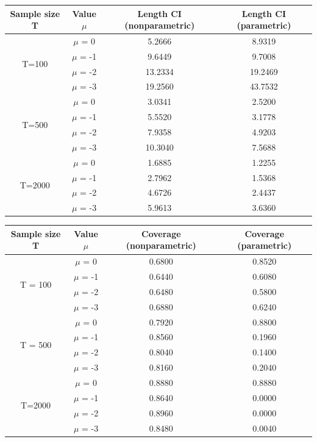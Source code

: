 \documentclass[12pt]{article}
\begin{document}
\begin{center}
\begin{tabular}{||c | c | c c||} 
 \hline
 Sample size T & Value $\mu$ & Length CI (nonparametric) & Length CI (parametric) \\ [0.5ex] 
 \hline\hline
 \multirow{4}{4em}{T=100} & $\mu$ = 0 & 5.2666 & 8.9319\\ 
& $\mu$ = -1 & 9.6449 & 9.7008 \\ 
& $\mu$ = -2 & 13.2334 & 19.2469 \\ 
& $\mu$ = -3 & 19.2560 & 43.7532 \\ 
 \hline
 \multirow{4}{4em}{T=500} & $\mu$ = 0 & 3.0341 & 2.5200\\ 
& $\mu$ = -1 & 5.5520 & 3.1778 \\ 
& $\mu$ = -2 & 7.9358 & 4.9203 \\ 
& $\mu$ = -3 & 10.3040 & 7.5688 \\ 
 \hline
 \multirow{4}{4em}{T=2000} & $\mu$ = 0 & 1.6885 & 1.2255\\ 
& $\mu$ = -1 & 2.7962 & 1.5368 \\ 
& $\mu$ = -2 & 4.6726 & 2.4437 \\ 
& $\mu$ = -3 & 5.9613 & 3.6360 \\ 
 \hline
\end{tabular}
\end{center}

\begin{center}
\begin{tabular}{||c | c | c c||} 
 \hline
 Sample size T & Value $\mu$ & Coverage (nonparametric) & Coverage (parametric) \\ [0.5ex] 
 \hline\hline
 \multirow{4}{4em}{T = 100} & $\mu$ = 0 & 0.6800 & 0.8520\\ 
& $\mu$ = -1 & 0.6440 & 0.6080 \\ 
& $\mu$ = -2 & 0.6480 & 0.5800 \\ 
& $\mu$ = -3 & 0.6880 & 0.6240 \\ 
 \hline
 \multirow{4}{4em}{T = 500} & $\mu$ = 0 & 0.7920 & 0.8800\\ 
& $\mu$ = -1 & 0.8560 & 0.1960 \\ 
& $\mu$ = -2 & 0.8040 & 0.1400 \\ 
& $\mu$ = -3 & 0.8160 & 0.2040 \\ 
 \hline
 \multirow{4}{4em}{T=2000} & $\mu$ = 0 & 0.8880 & 0.8880\\ 
& $\mu$ = -1 & 0.8640 & 0.0000 \\ 
& $\mu$ = -2 & 0.8960 & 0.0000 \\ 
& $\mu$ = -3 & 0.8480 & 0.0040 \\ 
 \hline
\end{tabular}
\end{center}
\end{document}
